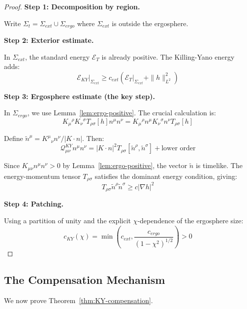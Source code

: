 \documentclass[12pt,a4paper]{article}
\begin{document}
\begin{proof}
\textbf{Step 1: Decomposition by region.}

Write $\Sigma_t = \Sigma_{ext} \cup \Sigma_{ergo}$ where $\Sigma_{ext}$ is outside the ergosphere.

\textbf{Step 2: Exterior estimate.}

In $\Sigma_{ext}$, the standard energy $\mathcal{E}_T$ is already positive. The Killing-Yano energy adds:
\begin{equation}
\mathcal{E}_{KY}|_{\Sigma_{ext}} \geq c_{ext}(\mathcal{E}_T|_{\Sigma_{ext}} + \|h\|^2_{L^2})
\end{equation}

\textbf{Step 3: Ergosphere estimate (the key step).}

In $\Sigma_{ergo}$, we use Lemma~\ref{lem:ergo-positive}. The crucial calculation is:
\begin{equation}
K_\mu{}^\rho K_\nu{}^\sigma T_{\rho\sigma}[h] n^\mu n^\nu = K_\mu{}^\rho n^\mu K_\nu{}^\sigma n^\nu T_{\rho\sigma}[h]
\end{equation}

Define $\tilde{n}^\mu = K^\mu{}_\nu n^\nu / |K \cdot n|$. Then:
\begin{equation}
\mathcal{Q}^{KY}_{\mu\nu}n^\mu n^\nu = |K \cdot n|^2 T_{\rho\sigma}[\tilde{n}^\rho, \tilde{n}^\sigma] + \text{lower order}
\end{equation}

Since $K_{\mu\nu}n^\mu n^\nu > 0$ by Lemma~\ref{lem:ergo-positive}, the vector $\tilde{n}$ is timelike. The energy-momentum tensor $T_{\rho\sigma}$ satisfies the dominant energy condition, giving:
\begin{equation}
T_{\rho\sigma}\tilde{n}^\rho \tilde{n}^\sigma \geq c |\nabla h|^2
\end{equation}

\textbf{Step 4: Patching.}

Using a partition of unity and the explicit $\chi$-dependence of the ergosphere size:
\begin{equation}
c_{KY}(\chi) = \min\left(c_{ext}, \frac{c_{ergo}}{(1-\chi^2)^{1/2}}\right) > 0
\end{equation}
\end{proof}

\subsection{The Compensation Mechanism}

We now prove Theorem~\ref{thm:KY-compensation}.
\end{document}
